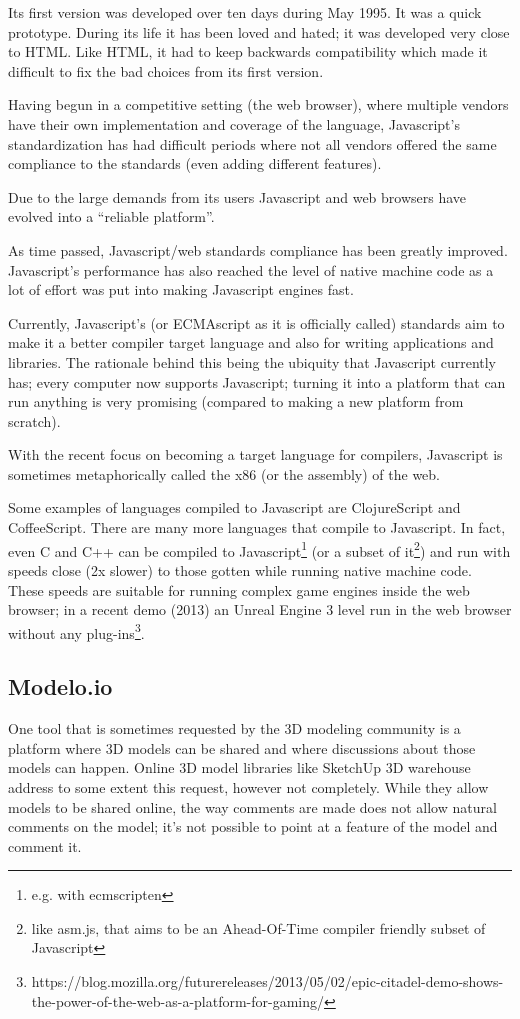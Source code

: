 \documentclass{./llncs2e/llncs}
\begin{document}
	Its first version was developed over ten days during May 1995.
	It was a quick prototype. 
	During its life it has been loved and hated; it was developed very close to HTML.
	Like HTML, it had to keep backwards compatibility which made it difficult to fix the bad choices from its first version.

	Having begun in a competitive setting (the web browser), where multiple vendors have their own implementation and coverage of the language, Javascript's standardization has had difficult periods where not all vendors offered the same compliance to the standards (even adding different features).

	Due to the large demands from its users Javascript and web browsers have evolved into a ``reliable platform''. 

	As time passed, Javascript/web standards compliance has been greatly improved.
	Javascript's performance has also reached the level of native machine code as a lot of effort was put into making Javascript engines fast.

	Currently, Javascript's (or ECMAscript as it is officially called) standards aim to make it a better compiler target language and also for writing applications and libraries.
	The rationale behind this being the ubiquity that Javascript currently has; every computer now supports Javascript; turning it into a platform that can run anything is very promising (compared to making a new platform from scratch).

	With the recent focus on becoming a target language for compilers, Javascript is sometimes metaphorically called the x86 (or the assembly) of the web.

	Some examples of languages compiled to Javascript are ClojureScript and CoffeeScript.
	There are many more languages that compile to Javascript. 
	In fact, even C and C++ can be compiled to Javascript\footnote{e.g. with ecmscripten} (or a subset of it\footnote{like asm.js, that aims to be an Ahead-Of-Time compiler friendly subset of Javascript}) and run with speeds close (2x slower) to those gotten while running native machine code. These speeds are suitable for running complex game engines inside the web browser; in a recent demo (2013) an Unreal Engine 3 level run in the web browser without any plug-ins\footnote{https://blog.mozilla.org/futurereleases/2013/05/02/epic-citadel-demo-shows-the-power-of-the-web-as-a-platform-for-gaming/}.

\subsection{Modelo.io}
	One tool that is sometimes requested by the 3D modeling community is a platform where 3D models can be shared and where discussions about those models can happen.
	Online 3D model libraries like SketchUp 3D warehouse address to some extent this request, however not completely. 
	While they allow models to be shared online, the way comments are made does not allow natural comments on the model; it's not possible to point at a feature of the model and comment it.
\end{document}
